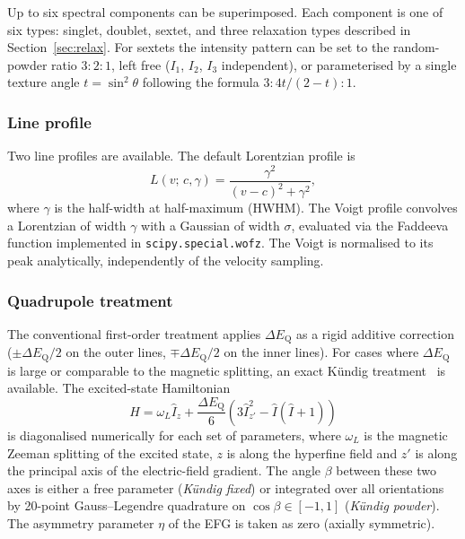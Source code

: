 \documentclass[smallcondensed]{svjour3}
\begin{document}
Up to six spectral components can be superimposed. Each component is one of
six types: singlet, doublet, sextet, and three relaxation types described in
Section~\ref{sec:relax}. For sextets the intensity pattern can be set to the
random-powder ratio $3:2:1$, left free ($I_1$, $I_2$, $I_3$ independent),
or parameterised by a single texture angle $t = \sin^2\!\theta$ following
the formula $3 : 4t/(2-t) : 1$.

\subsubsection{Line profile}
\label{sec:profile}

Two line profiles are available. The default Lorentzian profile is
\begin{equation}
  L(v;\,c,\gamma) = \frac{\gamma^2}{(v-c)^2 + \gamma^2},
\end{equation}
where $\gamma$ is the half-width at half-maximum (HWHM). The Voigt profile
convolves a Lorentzian of width $\gamma$ with a Gaussian of width $\sigma$,
evaluated via the Faddeeva function implemented in \texttt{scipy.special.wofz}.
The Voigt is normalised to its peak analytically, independently of the
velocity sampling.

\subsubsection{Quadrupole treatment}
\label{sec:quadrupole}

The conventional first-order treatment applies $\Delta E_\mathrm{Q}$ as a
rigid additive correction ($\pm\Delta E_\mathrm{Q}/2$ on the outer lines,
$\mp\Delta E_\mathrm{Q}/2$ on the inner lines). For cases where $\Delta
E_\mathrm{Q}$ is large or comparable to the magnetic splitting, an exact
Kündig treatment~\cite{kuendig1967} is available. The excited-state
Hamiltonian
\begin{equation}
  \hat{H} = \omega_L \hat{I}_z
  + \frac{\Delta E_\mathrm{Q}}{6}
    \left(3\hat{I}_{z'}^2 - \hat{I}(\hat{I}+1)\right)
  \label{eq:kuendig}
\end{equation}
is diagonalised numerically for each set of parameters, where $\omega_L$ is
the magnetic Zeeman splitting of the excited state, $z$ is along the
hyperfine field and $z'$ is along the principal axis of the electric-field
gradient. The angle $\beta$ between these two axes is either a free
parameter (\emph{Kündig fixed}) or integrated over all orientations by
20-point Gauss--Legendre quadrature on $\cos\beta \in [-1,1]$
(\emph{Kündig powder}). The asymmetry parameter $\eta$ of the EFG is taken
as zero (axially symmetric).
\end{document}
